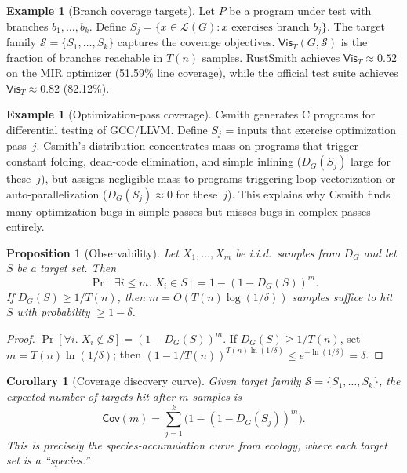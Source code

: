 \documentclass[11pt]{article}
\newcommand{\Lang}[1]{\mathcal{L}(#1)}
\newtheorem{proposition}[definition]{Proposition}
\newtheorem{corollary}[definition]{Corollary}
\theoremstyle{remark}
\theoremstyle{definition}
\newtheorem{example}[definition]{Example}
\begin{document}
\begin{example}[Branch coverage targets]\label{ex:branch-reach}
Let $P$ be a program under test with branches $b_1, \dots, b_k$.
Define $S_j = \{x \in \Lang{G} : x \text{ exercises branch } b_j\}$.
The target family $\mathcal{S} = \{S_1, \dots, S_k\}$ captures the
coverage objectives.  $\mathsf{Vis}_T(G, \mathcal{S})$ is the fraction
of branches reachable in $T(n)$ samples.
RustSmith achieves $\mathsf{Vis}_T \approx 0.52$ on the MIR optimizer
(51.59\% line coverage), while the official test suite achieves
$\mathsf{Vis}_T \approx 0.82$ (82.12\%).
\end{example}

\begin{example}[Optimization-pass coverage]\label{ex:opt-pass}
Csmith generates C programs for differential testing of GCC/LLVM.
Define $S_j$ = inputs that exercise optimization pass~$j$.
Csmith's distribution concentrates mass on programs that trigger
constant folding, dead-code elimination, and simple inlining
($D_G(S_j)$ large for these~$j$), but assigns negligible mass to
programs triggering loop vectorization or auto-parallelization
($D_G(S_j) \approx 0$ for these~$j$).
This explains why Csmith finds many optimization bugs in simple passes
but misses bugs in complex passes entirely.
\end{example}

\begin{proposition}[Observability]\label{prop:observability}
Let $X_1,\dots,X_m$ be i.i.d.\ samples from $D_G$ and let $S$ be a
target set.  Then
\[
  \Pr[\exists i \le m.\; X_i \in S]
  = 1 - (1-D_G(S))^m.
\]
If $D_G(S) \ge 1/T(n)$, then $m = O(T(n) \log(1/\delta))$ samples
suffice to hit $S$ with probability $\ge 1-\delta$.
\end{proposition}

\begin{proof}
$\Pr[\forall i.\; X_i \notin S] = (1 - D_G(S))^m$.
If $D_G(S) \ge 1/T(n)$, set $m = T(n) \ln(1/\delta)$; then
$(1-1/T(n))^{T(n)\ln(1/\delta)} \le e^{-\ln(1/\delta)} = \delta$.
\end{proof}

\begin{corollary}[Coverage discovery curve]\label{cor:discovery}
Given target family $\mathcal{S} = \{S_1, \dots, S_k\}$, the expected
number of targets hit after $m$ samples is
\[
  \mathsf{Cov}(m) = \sum_{j=1}^{k} \bigl(1 - (1 - D_G(S_j))^m\bigr).
\]
This is precisely the species-accumulation curve from ecology, where each
target set is a ``species.''
\end{corollary}
\end{document}
